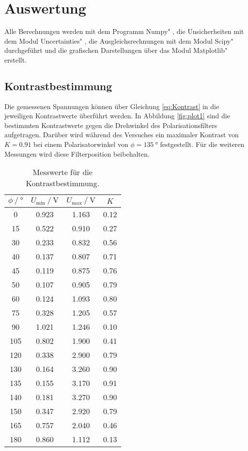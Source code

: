\section{Auswertung}
\label{sec:Auswertung}
Alle Berechnungen werden mit dem Programm \glqq Numpy" \cite{numpy}, die Unsicherheiten mit dem Modul \glqq Uncertainties" \cite{uncertainties}, die Ausgleichsrechnungen mit dem Modul \glqq Scipy" \cite{scipy} durchgeführt und die grafischen Darstellungen über das Modul \glqq Matplotlib" \cite{matplotlib} erstellt.

\subsection{Kontrastbestimmung}

Die gemessenen Spannungen können über Gleichung \eqref{eq:Kontrast} in die jeweiligen Kontrastwerte überführt werden.
In Abbildung \ref{fig:plot1} sind die bestimmten Kontrastwerte gegen die Drehwinkel des Polarisationsfilters aufgetragen.
Darüber wird während des Versuches ein maximaler Kontrast von $K = \num{0.91}$ bei einem Polarisatorwinkel von $\phi = \SI{135}{\degree}$ festgestellt.
Für die weiteren Messungen wird diese Filterposition beibehalten.

\begin{table}
    \centering
    \caption{Messwerte für die Kontrastbestimmung. }
    \label{tab:kontrast}
    \begin{tabular}{S[table-format = 3] S S S }
        \toprule   
        {$\phi \mathbin{/} \si{\degree}$} & {$U_\text{min} \mathbin{/} \si{\volt}$} & {$U_\text{max} \mathbin{/} \si{\volt}$} & {$K$} \\
           & 0.923 &  1.163 & 0.12 \\   
        15  & 0.522 &  0.910 & 0.27 \\
        30  & 0.233 &  0.832 & 0.56 \\
        40  & 0.137 &  0.807 & 0.71 \\
        45  & 0.119 &  0.875 & 0.76 \\
        50  & 0.107 &  0.905 & 0.79 \\
        60  & 0.124 &  1.093 & 0.80 \\ 
        75  & 0.328 &  1.205 & 0.57 \\
        90  & 1.021 &  1.246 & 0.10 \\
        105 & 0.802 &  1.900 & 0.41 \\
        120 & 0.338 &  2.900 & 0.79 \\
        130 & 0.164 &  3.260 & 0.90 \\
        135 & 0.155 &  3.170 & 0.91 \\
        140 & 0.181 &  3.270 & 0.90 \\
        150 & 0.347 &  2.920 & 0.79 \\
        165 & 0.757 &  2.040 & 0.46 \\
        180 & 0.860 &  1.112 & 0.13 \\
        \bottomrule

    \end{tabular}
\end{table}

